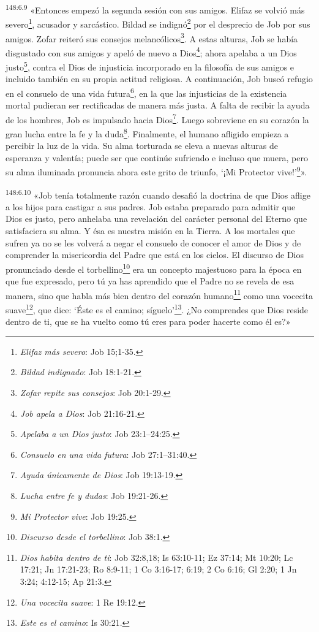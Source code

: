 \par 
\textsuperscript{148:6.9} «Entonces empezó la segunda sesión con sus amigos. Elifaz se volvió más severo\footnote{\textit{Elifaz más severo}: Job 15;1-35.}, acusador y sarcástico. Bildad se indignó\footnote{\textit{Bildad indignado}: Job 18:1-21.} por el desprecio de Job por sus amigos. Zofar reiteró sus consejos melancólicos\footnote{\textit{Zofar repite sus consejos}: Job 20:1-29.}. A estas alturas, Job se había disgustado con sus amigos y apeló de nuevo a Dios\footnote{\textit{Job apela a Dios}: Job 21:16-21.}; ahora apelaba a un Dios justo\footnote{\textit{Apelaba a un Dios justo}: Job 23:1--24:25.}, contra el Dios de injusticia incorporado en la filosofía de sus amigos e incluido también en su propia actitud religiosa. A continuación, Job buscó refugio en el consuelo de una vida futura\footnote{\textit{Consuelo en una vida futura}: Job 27:1--31:40.}, en la que las injusticias de la existencia mortal pudieran ser rectificadas de manera más justa. A falta de recibir la ayuda de los hombres, Job es impulsado hacia Dios\footnote{\textit{Ayuda únicamente de Dios}: Job 19:13-19.}. Luego sobreviene en su corazón la gran lucha entre la fe y la duda\footnote{\textit{Lucha entre fe y dudas}: Job 19:21-26.}. Finalmente, el humano afligido empieza a percibir la luz de la vida. Su alma torturada se eleva a nuevas alturas de esperanza y valentía; puede ser que continúe sufriendo e incluso que muera, pero su alma iluminada pronuncia ahora este grito de triunfo, `¡Mi Protector vive!'\footnote{\textit{Mi Protector vive}: Job 19:25.}».

\par 
\textsuperscript{148:6.10} «Job tenía totalmente razón cuando desafió la doctrina de que Dios aflige a los hijos para castigar a sus padres. Job estaba preparado para admitir que Dios es justo, pero anhelaba una revelación del carácter personal del Eterno que satisfaciera su alma. Y ésa es nuestra misión en la Tierra. A los mortales que sufren ya no se les volverá a negar el consuelo de conocer el amor de Dios y de comprender la misericordia del Padre que está en los cielos. El discurso de Dios pronunciado desde el torbellino\footnote{\textit{Discurso desde el torbellino}: Job 38:1.} era un concepto majestuoso para la época en que fue expresado, pero tú ya has aprendido que el Padre no se revela de esa manera, sino que habla más bien dentro del corazón humano\footnote{\textit{Dios habita dentro de ti}: Job 32:8,18; Is 63:10-11; Ez 37:14; Mt 10:20; Lc 17:21; Jn 17:21-23; Ro 8:9-11; 1 Co 3:16-17; 6:19; 2 Co 6:16; Gl 2:20; 1 Jn 3:24; 4:12-15; Ap 21:3.} como una vocecita suave\footnote{\textit{Una vocecita suave}: 1 Re 19:12.}, que dice: `Éste es el camino; síguelo'\footnote{\textit{Este es el camino}: Is 30:21.}. ¿No comprendes que Dios reside dentro de ti, que se ha vuelto como tú eres para poder hacerte como él es?»

